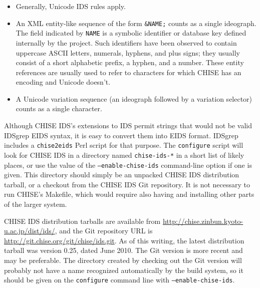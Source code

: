 \documentclass[twocolumn]{report}
\begin{document}
\begin{itemize}
\item Generally, Unicode IDS rules apply.
\item An XML entity-like sequence of the form \texttt{\&NAME;} counts as a
single ideograph.  The field indicated by \texttt{NAME} is a symbolic
identifier or database key defined internally by the project.  Such
identifiers have been observed to contain uppercase ASCII letters, numerals,
hyphens, and plus signs; they usually consist of a short alphabetic
prefix, a hyphen, and a number.  These entity references are usually used to
refer to characters for which CHISE has an encoding and Unicode doesn't.
\item A Unicode variation sequence (an ideograph followed by a variation
selector) counts as a single character.
\end{itemize}

Although CHISE IDS's extensions to IDS permit strings that would not be
valid IDSgrep EIDS syntax, it is easy to convert them into EIDS format. 
IDSgrep includes a \texttt{chise2eids} Perl script for that purpose.  The
\texttt{configure} script will look for CHISE IDS in a directory named
\texttt{chise-ids-*} in a short list of likely places, or use the value of
the \texttt{--enable-chise-ids} command-line option if one is given.  This
directory should simply be an unpacked CHISE IDS distribution tarball, or a
checkout from the CHISE IDS Git repository.  It is not necessary to run
CHISE's Makefile, which would require also having and installing other parts
of the larger system.

CHISE IDS distribution tarballs are available from
\url{http://chise.zinbun.kyoto-u.ac.jp/dist/ids/}, and the Git repository
URL is \url{http://git.chise.org/git/chise/ids.git}.  As of this writing,
the latest distribution tarball was version 0.25, dated June 2010.  The Git
version is more recent and may be preferable.  The directory created by
checking out the Git version will probably not have a name recognized
automatically by the build system, so it should be given on the
\texttt{configure} command line with \texttt{--enable-chise-ids}.
\end{document}
